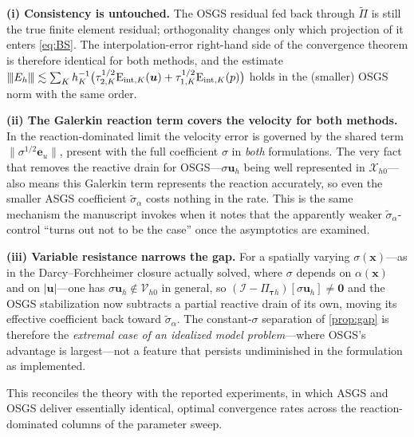 \documentclass[11pt]{article}
\newcommand{\triplenorm}[1]{{\lvert\kern-0.25ex\lvert\kern-0.25ex\lvert #1
\rvert\kern-0.25ex\rvert\kern-0.25ex\rvert}}
\theoremstyle{plain}
\theoremstyle{remark}
\newcommand{\uh}{\boldsymbol{u}_h}
\newcommand{\Xh}{\mathcal{X}_{h0}}
\newcommand{\Pio}{\Pi_{\boldsymbol{\tau}h}}            %
\newcommand{\Porth}{\widetilde{\Pi}}                  %
\newcommand{\siga}{\widetilde{\sigma}_\alpha}
\begin{document}
\smallskip
\noindent\textbf{(i) Consistency is untouched.} The OSGS residual fed back through
$\Porth$ is still the true finite element residual; orthogonality changes only
which projection of it enters \cref{eq:BS}. The interpolation-error right-hand side
of the convergence theorem is therefore identical for both methods, and the
estimate
$
  \triplenorm{E_h}\lesssim\sum_K h_K^{-1}\big(\tau_{2,K}^{1/2}\mathrm{E}_{\mathrm{int},K}(\boldsymbol{u})
  +\tau_{1,K}^{1/2}\mathrm{E}_{\mathrm{int},K}(p)\big)
$
holds in the (smaller) OSGS norm with the same order.

\smallskip
\noindent\textbf{(ii) The Galerkin reaction term covers the velocity for both
methods.} In the reaction-dominated limit the velocity error is governed by the
shared term $\|\sigma^{1/2}\boldsymbol{e}_u\|$, present with the full coefficient
$\sigma$ in \emph{both} formulations. The very fact that removes the reactive drain
for OSGS---$\sigma\uh$ being well represented in $\Xh$---also means this Galerkin
term represents the reaction accurately, so even the smaller ASGS coefficient
$\siga$ costs nothing in the rate. This is the same mechanism the manuscript invokes
when it notes that the apparently weaker $\siga$-control ``turns out not to be the
case'' once the asymptotics are examined.

\smallskip
\noindent\textbf{(iii) Variable resistance narrows the gap.} For a spatially
varying $\sigma(\boldsymbol{x})$---as in the Darcy--Forchheimer closure actually
solved, where $\sigma$ depends on $\alpha(\boldsymbol{x})$ and on
$|\boldsymbol{u}|$---one has $\sigma\uh\notin\mathcal{V}_{h0}$ in general, so
$(\mathcal{I}-\Pio)[\sigma\uh]\neq\boldsymbol{0}$ and the OSGS stabilization now
subtracts a partial reactive drain of its own, moving its effective coefficient back
toward $\siga$. The constant-$\sigma$ separation of \cref{prop:gap} is therefore the
\emph{extremal case of an idealized model problem}---where OSGS's advantage is
largest---not a feature that persists undiminished in the formulation as
implemented.

\smallskip
This reconciles the theory with the reported experiments, in which ASGS and OSGS
deliver essentially identical, optimal convergence rates across the
reaction-dominated columns of the parameter sweep.

\end{document}
